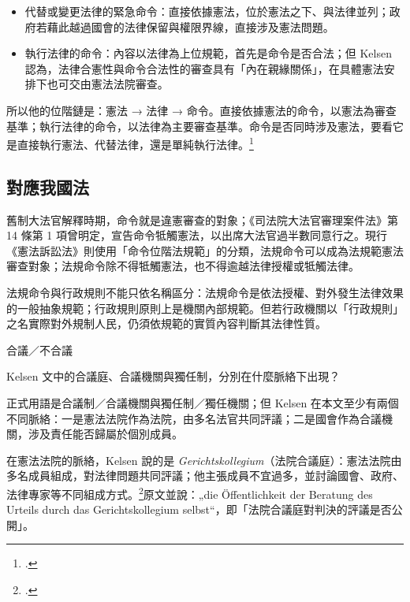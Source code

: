 \begin{itemize}
\tightlist
\item
  代替或變更法律的緊急命令：直接依據憲法，位於憲法之下、與法律並列；政府若藉此越過國會的法律保留與權限界線，直接涉及憲法問題。
\item
  執行法律的命令：內容以法律為上位規範，首先是命令是否合法；但 Kelsen 認為，法律合憲性與命令合法性的審查具有「內在親緣關係」，在具體憲法安排下也可交由憲法法院審查。
\end{itemize}

所以他的位階鏈是：憲法 → 法律 → 命令。直接依據憲法的命令，以憲法為審查基準；執行法律的命令，以法律為主要審查基準。命令是否同時涉及憲法，要看它是直接執行憲法、代替法律，還是單純執行法律。\footcites[58--65]{kelsen1929}[50--56]{kelsen2015}

\subsection{對應我國法}

舊制大法官解釋時期，命令就是違憲審查的對象；《司法院大法官審理案件法》第 14 條第 1 項曾明定，宣告命令牴觸憲法，以出席大法官過半數同意行之。現行《憲法訴訟法》則使用「命令位階法規範」的分類，法規命令可以成為法規範憲法審查對象；法規命令除不得牴觸憲法，也不得逾越法律授權或牴觸法律。

法規命令與行政規則不能只依名稱區分：法規命令是依法授權、對外發生法律效果的一般抽象規範；行政規則原則上是機關內部規範。但若行政機關以「行政規則」之名實際對外規制人民，仍須依規範的實質內容判斷其法律性質。


\begin{qaprompt}
合議／不合議
\end{qaprompt}

\begin{qaquestion}
Kelsen 文中的合議庭、合議機關與獨任制，分別在什麼脈絡下出現？
\end{qaquestion}

正式用語是合議制／合議機關與獨任制／獨任機關；但 Kelsen 在本文至少有兩個不同脈絡：一是憲法法院作為法院，由多名法官共同評議；二是國會作為合議機關，涉及責任能否歸屬於個別成員。

在憲法法院的脈絡，Kelsen 說的是 \emph{Gerichtskollegium}（法院合議庭）：憲法法院由多名成員組成，對法律問題共同評議；他主張成員不宜過多，並討論國會、政府、法律專家等不同組成方式。\footcites[47--48, 67]{kelsen2015}[56--57, 76--77]{kelsen1929}原文並說：„die Öffentlichkeit der Beratung des Urteils durch das Gerichtskollegium selbst``，即「法院合議庭對判決的評議是否公開」。

